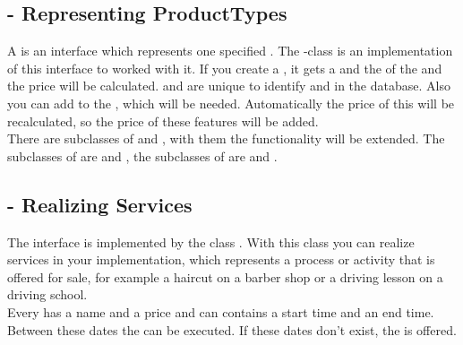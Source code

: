 \subsection{ - Representing ProductTypes}
A  is an interface which represents one specified . The -class is an implementation of this interface to worked with it.
If you create a , it gets a  and the  of the  and the price will be calculated.
 and  are unique  to identify  and  in the database. 
Also you can add  to the , which will be needed. Automatically the price of this  will be recalculated, 
so the price of these features will be added.\\
There are subclasses of  and , with them the functionality will be extended. The subclasses of  are  and 
, the subclasses of  are  and . 

\subsection{ - Realizing Services}
The interface  is implemented by the class . With this class you can realize services in your implementation, which represents a process 
or activity that is offered for sale, for example a haircut on a barber shop or a driving lesson on a driving school.\\
Every  has a name and a price and can contains a start time and an end time. Between these dates the  can be executed. If these dates 
don’t exist, the  is offered.

